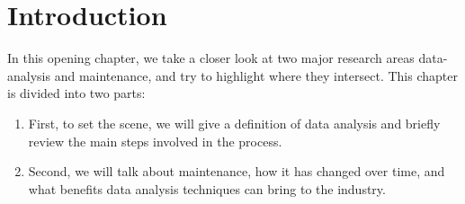 \chapter{Introduction}\label{chapter:intro}
In this opening chapter, we take a closer look at two major research areas data-analysis and maintenance, and try to highlight where they intersect.
This chapter is divided into two parts:
\begin{enumerate}
    \item First, to set the scene, we will give a definition of data analysis and briefly review the main steps involved in the process.
    \item Second, we will talk about maintenance, how it has changed over time, and what benefits data analysis techniques can bring to the industry.
\end{enumerate}





